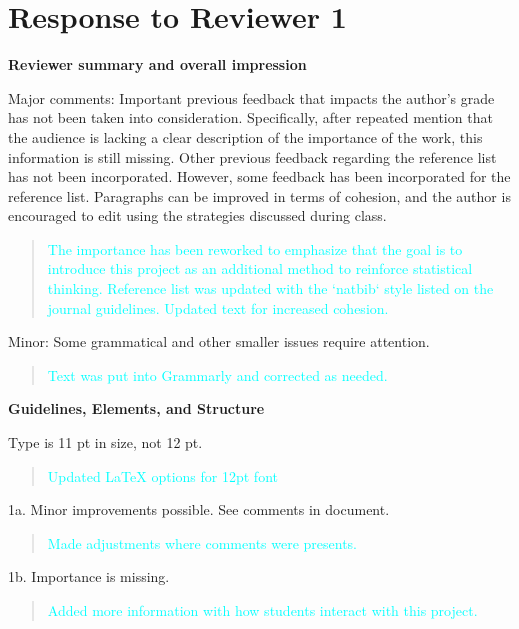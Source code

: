 \documentclass[
  12pt,
  letterpaper,
  DIV=11,
  numbers=noendperiod]{scrartcl}
\author{}
\date{}
\begin{document}
\section{Response to Reviewer 1}\label{response-to-reviewer-1}

\textbf{Reviewer summary and overall impression}

Major comments: Important previous feedback that impacts the author's
grade has not been taken into consideration. Specifically, after
repeated mention that the audience is lacking a clear description of the
importance of the work, this information is still missing. Other
previous feedback regarding the reference list has not been
incorporated. However, some feedback has been incorporated for the
reference list. Paragraphs can be improved in terms of cohesion, and the
author is encouraged to edit using the strategies discussed during
class.

\begin{quote}
\textcolor{cyan}{The importance has been reworked to emphasize that the goal is to introduce this project as an additional method to reinforce statistical thinking. Reference list was updated with the `natbib` style listed on the journal guidelines. Updated text for increased cohesion.}
\end{quote}

Minor: Some grammatical and other smaller issues require attention.

\begin{quote}
\textcolor{cyan}{Text was put into Grammarly and corrected as needed.}
\end{quote}

\textbf{Guidelines, Elements, and Structure}

Type is 11 pt in size, not 12 pt.~

\begin{quote}
\textcolor{cyan}{Updated LaTeX options for 12pt font}
\end{quote}

1a. Minor improvements possible. See comments in document.

\begin{quote}
\textcolor{cyan}{Made adjustments where comments were presents.}
\end{quote}

1b. Importance is missing.

\begin{quote}
\textcolor{cyan}{Added more information with how students interact with this project.}
\end{quote}
\end{document}
